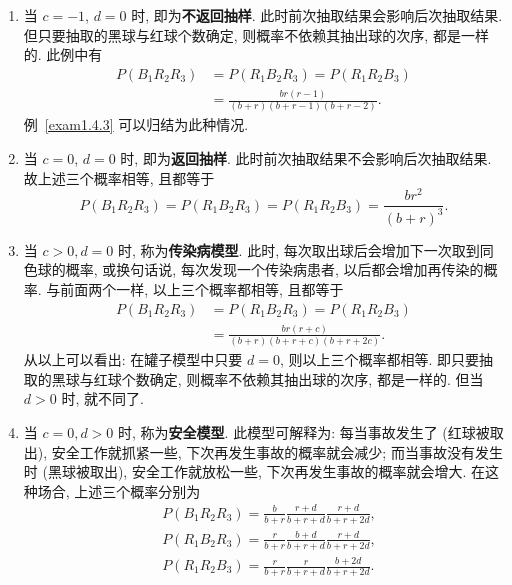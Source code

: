 \begin{enumerate}
    \item 当 $c=-1$, $d=0$ 时,
          即为\textbf{不返回抽样}.
          此时前次抽取结果会影响后次抽取结果.
          但只要抽取的黑球与红球个数确定,
          则概率不依赖其抽出球的次序,
          都是一样的.
          此例中有
          \begin{align*}
              P(B_1 R_2 R_3) & = P(R_1 B_2 R_3) = P(R_1 R_2 B_3)        \\
                             & = \frac{br(r-1)}{(b+r) (b+r-1) (b+r-2)}.
          \end{align*}
          例~\ref{exam1.4.3} 可以归结为此种情况.

    \item 当 $c=0$, $d=0$ 时,
          即为\textbf{返回抽样}.
          此时前次抽取结果不会影响后次抽取结果.
          故上述三个概率相等,
          且都等于
          \[
              P(B_1 R_2 R_3) = P(R_1 B_2 R_3) = P(R_1 R_2 B_3) = \frac{br^2}{(b+r)^3}.
          \]

    \item 当 $c>0, d=0$ 时,
          称为\textbf{传染病模型}.
          此时,
          每次取出球后会增加下一次取到同色球的概率,
          或换句话说,
          每次发现一个传染病患者,
          以后都会增加再传染的概率.
          与前面两个一样,
          以上三个概率都相等,
          且都等于
          \begin{align*}
              P(B_1 R_2 R_3) & = P(R_1 B_2 R_3) = P(R_1 R_2 B_3)       \\
                             & = \frac{br(r+c)}{(b+r)(b+r+c)(b+r+2c)}.
          \end{align*}
          从以上可以看出:
          在罐子模型中只要 $d=0$,
          则以上三个概率都相等.
          即只要抽取的黑球与红球个数确定,
          则概率不依赖其抽出球的次序,
          都是一样的.
          但当 $d>0$ 时,
          就不同了.

    \item 当 $c=0, d>0$ 时,
          称为\textbf{安全模型}.
          此模型可解释为:
          每当事故发生了 (红球被取出),
          安全工作就抓紧一些,
          下次再发生事故的概率就会减少;
          而当事故没有发生时 (黑球被取出),
          安全工作就放松一些,
          下次再发生事故的概率就会增大.
          在这种场合,
          上述三个概率分别为
          \begin{align*}
               & P(B_1 R_2 R_3) = \frac{b}{b+r} \frac{r+d}{b+r+d} \frac{r+d}{b+r+2d}, \\
               & P(R_1 B_2 R_3) = \frac{r}{b+r} \frac{b+d}{b+r+d} \frac{r+d}{b+r+2d}, \\
               & P(R_1 R_2 B_3) = \frac{r}{b+r} \frac{r}{b+r+d} \frac{b+2d}{b+r+2d}.
          \end{align*}
\end{enumerate}

